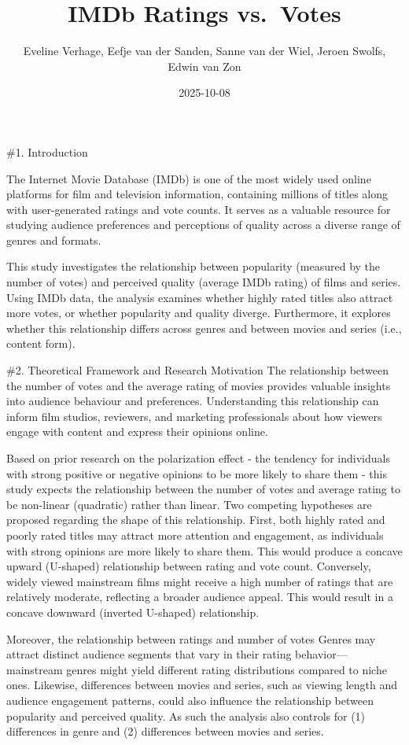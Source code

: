 \documentclass[
  11pt,
]{article}
\title{IMDb Ratings vs.~Votes}
\author{Eveline Verhage, Eefje van der Sanden, Sanne van der Wiel,
Jeroen Swolfs, Edwin van Zon}
\date{2025-10-08}
\begin{document}
\maketitle

{
\setcounter{tocdepth}{2}
\tableofcontents
}
\#1. Introduction

The Internet Movie Database (IMDb) is one of the most widely used online
platforms for film and television information, containing millions of
titles along with user-generated ratings and vote counts. It serves as a
valuable resource for studying audience preferences and perceptions of
quality across a diverse range of genres and formats.

This study investigates the relationship between popularity (measured by
the number of votes) and perceived quality (average IMDb rating) of
films and series. Using IMDb data, the analysis examines whether highly
rated titles also attract more votes, or whether popularity and quality
diverge. Furthermore, it explores whether this relationship differs
across genres and between movies and series (i.e., content form).

\#2. Theoretical Framework and Research Motivation The relationship
between the number of votes and the average rating of movies provides
valuable insights into audience behaviour and preferences. Understanding
this relationship can inform film studios, reviewers, and marketing
professionals about how viewers engage with content and express their
opinions online.

Based on prior research on the polarization effect - the tendency for
individuals with strong positive or negative opinions to be more likely
to share them - this study expects the relationship between the number
of votes and average rating to be non-linear (quadratic) rather than
linear. Two competing hypotheses are proposed regarding the shape of
this relationship. First, both highly rated and poorly rated titles may
attract more attention and engagement, as individuals with strong
opinions are more likely to share them. This would produce a concave
upward (U-shaped) relationship between rating and vote count.
Conversely, widely viewed mainstream films might receive a high number
of ratings that are relatively moderate, reflecting a broader audience
appeal. This would result in a concave downward (inverted U-shaped)
relationship.

Moreover, the relationship between ratings and number of votes Genres
may attract distinct audience segments that vary in their rating
behavior---mainstream genres might yield different rating distributions
compared to niche ones. Likewise, differences between movies and series,
such as viewing length and audience engagement patterns, could also
influence the relationship between popularity and perceived quality. As
such the analysis also controls for (1) differences in genre and (2)
differences between movies and series.
\end{document}
